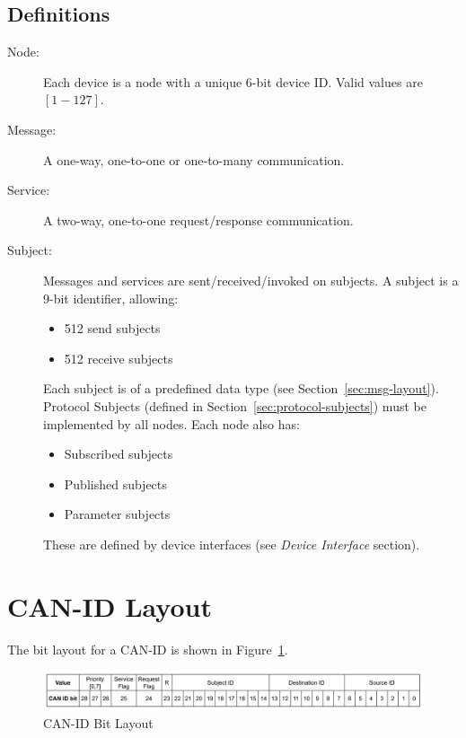 \documentclass[a4paper,12pt]{article}
\begin{document}
\subsection{Definitions}
\begin{description}
    \item[Node:] Each device is a node with a unique 6-bit device ID. Valid values are \([1{-}127]\).
    \item[Message:] A one-way, one-to-one or one-to-many communication.
    \item[Service:] A two-way, one-to-one request/response communication.
    \item[Subject:] Messages and services are sent/received/invoked on subjects. A subject is a 9-bit identifier, allowing:
    \begin{itemize}
        \item 512 send subjects
        \item 512 receive subjects
    \end{itemize}
    Each subject is of a predefined data type (see Section~\ref{sec:msg-layout}). Protocol Subjects (defined in Section~\ref{sec:protocol-subjects}) must be implemented by all nodes. Each node also has:
    \begin{itemize}
        \item Subscribed subjects
        \item Published subjects
        \item Parameter subjects
    \end{itemize}
    These are defined by device interfaces (see \textit{Device Interface} section).
\end{description}
\newpage

\section{CAN-ID Layout}
The bit layout for a CAN-ID is shown in Figure~\ref{fig:canid-layout}.

\begin{figure}[h!]
    \centering
    \includegraphics[width=1.0\linewidth]{figures/CANID_bitlayout.png}
    \caption{CAN-ID Bit Layout}
    \label{fig:canid-layout}
\end{figure}
\end{document}
